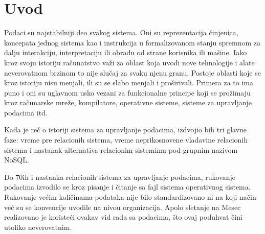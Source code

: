 \documentclass[12pt,oneside]{memoir}
\begin{document}
\frontmatter
\naslovna
\komisija
\apstrakt
\tableofcontents*

\mainmatter

\chapter{Uvod}

Podaci su najstabilniji deo svakog sistema. Oni su reprezentacija činjenica, koncepata jednog sistema kao i instrukcija u formalizovanom stanju spremnom za dalju interakciju, interpretaciju ili obradu od strane korisnika ili mašine. Iako kroz svoju istoriju računatstvo važi za oblast koja uvodi nove tehnologije i alate neverovatnom brzinom to  nije slučaj za svaku njenu granu. Postoje oblasti koje se kroz istoriju nisu menjali, ili su se slabo menjali i proširivali. Primera za to ima puno i oni su uglavnom usko vezani za funkcionalne principe koji se prožimaju kroz računarske mreže, kompilatore, operativne sisteme, sisteme za upravljanje podacima itd. 

Kada je reč o istoriji sistema za upravljanje podacima, izdvojio bih tri glavne faze: vreme pre relacionih sistema, vreme neprikosnovene vladavine relacionih sistema i nastanak alternativa relacionim sistemima pod grupnim nazivom NoSQL.

Do 70ih i nastanka relacionih sistema za upravljanje podacima, rukovanje podacima izvodilo se kroz pisanje i čitanje sa fajl sistema operativnog sistema. Rukovanje većim količinama podataka nije bilo standardizovano ni na koji način već su se konvencije uvodile na nivou organizacija. Apolo sletanje na Mesec realizovano je koristeći ovakav vid rada sa podacima, što ovaj poduhvat čini utoliko neverovatnim. 
\end{document}
